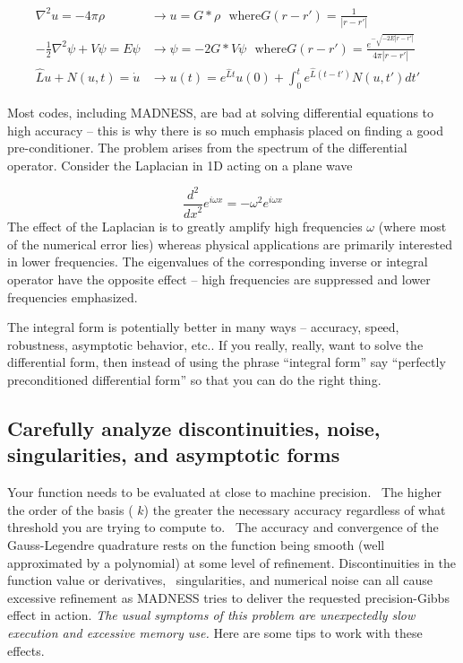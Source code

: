 \begin{align*}\label{eqn:refText8}
\nabla ^{2}u=-4\pi \rho                     & \to u=G\ast \rho    \ \ \    \textrm{where} G(r-r')=\frac{1}{|r-r'|} \\
-{\frac{1}{2}}\nabla ^{2}\psi +V\psi =E\psi & \to \psi =-2G\ast V\psi \ \ \ \textrm{where} G(r-r')=\frac{e^{-\sqrt{-2E|r-r'|}}}{4\pi |r-r'|}\\
\hat{L}u+N(u,t)=\dot{u}                     & \to u(t)=e^{\hat{L}t}u(0) +\int _{0}^{t}e^{\hat{L}(t-t')}N(u,t')\mathit{dt}' &
\end{align*}

Most codes, including MADNESS, are bad at solving differential equations to high accuracy -- this is why there is so
much emphasis placed on finding a good pre-conditioner. The problem arises from the spectrum of the differential
operator. Consider the Laplacian in 1D acting on a plane wave 

\begin{equation}
\frac{d^{2}}{\mathit{dx}^{2}}e^{i\omega x}=-\omega ^{2}e^{i\omega x}
\end{equation}
The effect of the Laplacian is to greatly amplify high frequencies  $\omega $ (where most of the numerical error lies)
whereas physical applications are primarily interested in lower frequencies. The eigenvalues of the corresponding
inverse or integral operator have the opposite effect -- high frequencies are suppressed and lower frequencies
emphasized.

The integral form is potentially better in many ways -- accuracy, speed, robustness, asymptotic behavior, etc.. If you
really, really, want to solve the differential form, then instead of using the phrase ``integral form'' say ``perfectly
preconditioned differential form'' so that you can do the right thing.

\subsection{Carefully analyze discontinuities, noise, singularities, and asymptotic forms}
Your function needs to be evaluated at close to machine precision. \ The higher the order of the basis ( $k$) the
greater the necessary accuracy regardless of what threshold you are trying to compute to. \ The accuracy and
convergence of the Gauss-Legendre quadrature rests on the function being smooth (well approximated by a polynomial) at
some level of refinement. Discontinuities in the function value or derivatives, \ singularities, and numerical noise
can all cause excessive refinement as MADNESS tries to deliver the requested precision-Gibbs effect in action.
\textit{The usual symptoms of this problem are unexpectedly slow execution and excessive memory use.} Here are some
tips to work with these effects.

